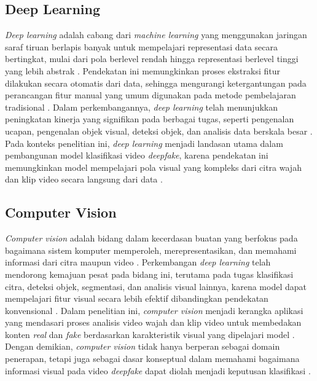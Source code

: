 \subsection{Deep Learning} \label{II.Teori2}
\textit{Deep learning} adalah cabang dari \textit{machine learning} yang menggunakan jaringan saraf tiruan berlapis banyak untuk mempelajari representasi data secara bertingkat, mulai dari pola berlevel rendah hingga representasi berlevel tinggi yang lebih abstrak \cite{LeCun2015}. Pendekatan ini memungkinkan proses ekstraksi fitur dilakukan secara otomatis dari data, sehingga mengurangi ketergantungan pada perancangan fitur manual yang umum digunakan pada metode pembelajaran tradisional \cite{LeCun2015}. Dalam perkembangannya, \textit{deep learning} telah menunjukkan peningkatan kinerja yang signifikan pada berbagai tugas, seperti pengenalan ucapan, pengenalan objek visual, deteksi objek, dan analisis data berskala besar \cite{LeCun2015}. Pada konteks penelitian ini, \textit{deep learning} menjadi landasan utama dalam pembangunan model klasifikasi video \textit{deepfake}, karena pendekatan ini memungkinkan model mempelajari pola visual yang kompleks dari citra wajah dan klip video secara langsung dari data \cite{LeCun2015}\cite{Voulodimos2018}. \par

\subsection{Computer Vision} \label{II.Teori3}
\textit{Computer vision} adalah bidang dalam kecerdasan buatan yang berfokus pada bagaimana sistem komputer memperoleh, merepresentasikan, dan memahami informasi dari citra maupun video \cite{Voulodimos2018}. Perkembangan \textit{deep learning} telah mendorong kemajuan pesat pada bidang ini, terutama pada tugas klasifikasi citra, deteksi objek, segmentasi, dan analisis visual lainnya, karena model dapat mempelajari fitur visual secara lebih efektif dibandingkan pendekatan konvensional \cite{Voulodimos2018}. Dalam penelitian ini, \textit{computer vision} menjadi kerangka aplikasi yang mendasari proses analisis video wajah dan klip video untuk membedakan konten \textit{real} dan \textit{fake} berdasarkan karakteristik visual yang dipelajari model \cite{Voulodimos2018}. Dengan demikian, \textit{computer vision} tidak hanya berperan sebagai domain penerapan, tetapi juga sebagai dasar konseptual dalam memahami bagaimana informasi visual pada video \textit{deepfake} dapat diolah menjadi keputusan klasifikasi \cite{Voulodimos2018}. \par

